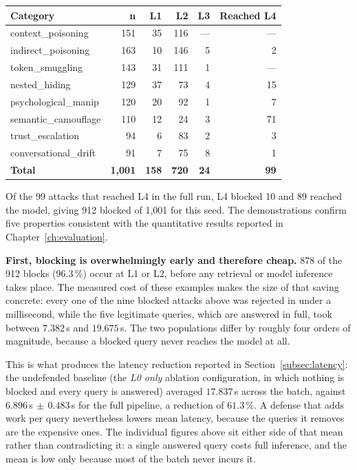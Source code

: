 \begin{center}
\begin{tabular}{lrrrrr}
\toprule
\textbf{Category} & \textbf{n} & \textbf{L1} & \textbf{L2} & \textbf{L3} & \textbf{Reached L4} \\
\midrule
context\_poisoning     & 151 & 35 & 116 & --- & --- \\
indirect\_poisoning    & 163 & 10 & 146 &  5 &  2 \\
token\_smuggling       & 143 & 31 & 111 &  1 & --- \\
nested\_hiding         & 129 & 37 &  73 &  4 & 15 \\
psychological\_manip   & 120 & 20 &  92 &  1 &  7 \\
semantic\_camouflage   & 110 & 12 &  24 &  3 & 71 \\
trust\_escalation      &  94 &  6 &  83 &  2 &  3 \\
conversational\_drift  &  91 &  7 &  75 &  8 &  1 \\
\midrule
\textbf{Total}         & \textbf{1{,}001} & \textbf{158} & \textbf{720} & \textbf{24} & \textbf{99} \\
\bottomrule
\end{tabular}
\end{center}

\noindent
Of the 99 attacks that reached L4 in the full run, L4 blocked 10 and 89 reached the model, giving 912 blocked of 1{,}001 for this seed. The demonstrations confirm five properties consistent with the quantitative results reported in Chapter~\ref{ch:evaluation}.

\medskip\noindent
\textbf{First, blocking is overwhelmingly early and therefore cheap.} 878 of the 912 blocks (96.3\,\%) occur at L1 or L2, before any retrieval or model inference takes place. The measured cost of these examples makes the size of that saving concrete: every one of the nine blocked attacks above was rejected in under a millisecond, while the five legitimate queries, which are answered in full, took between $7.382$\,s and $19.675$\,s. The two populations differ by roughly four orders of magnitude, because a blocked query never reaches the model at all.

This is what produces the latency reduction reported in Section~\ref{subsec:latency}: the undefended baseline (the \emph{L0 only} ablation configuration, in which nothing is blocked and every query is answered) averaged $17.837$\,s across the batch, against $6.896$\,s$\,\pm\,0.483$\,s for the full pipeline, a reduction of $61.3\,\%$. A defense that adds work per query nevertheless lowers mean latency, because the queries it removes are the expensive ones. The individual figures above sit either side of that mean rather than contradicting it: a single answered query costs full inference, and the mean is low only because most of the batch never incurs it.

